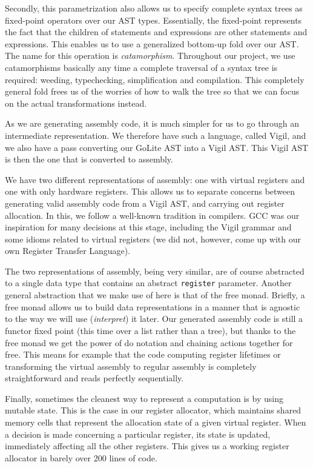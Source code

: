 \documentclass[letterpaper,11pt]{article}
\begin{document}
Secondly, this parametrization also allows us to specify complete syntax trees as fixed-point operators over our AST types. Essentially, the fixed-point represents the fact that the children of statements and expressions are other statements and expressions. This enables us to use a generalized bottom-up fold over our AST. The name for this operation is \emph{catamorphism}. Throughout our project, we use catamorphisms basically any time a complete traversal of a syntax tree is required: weeding, typechecking, simplification and compilation. This completely general fold frees us of the worries of how to walk the tree so that we can focus on the actual transformations instead.

As we are generating assembly code, it is much simpler for us to go through an intermediate representation. We therefore have such a language, called Vigil, and we also have a pass converting our GoLite AST into a Vigil AST. This Vigil AST is then the one that is converted to assembly.

We have two different representations of assembly: one with virtual registers and one with only hardware registers. This allows us to separate concerns between generating valid assembly code from a Vigil AST, and carrying out register allocation. In this, we follow a well-known tradition in compilers. GCC was our inspiration for many decisions at this stage, including the Vigil grammar and some idioms related to virtual registers (we did not, however, come up with our own Register Transfer Language).

The two representations of assembly, being very similar, are of course abstracted to a single data type that contains an abstract \texttt{register} parameter. Another general abstraction that we make use of here is that of the free monad. Briefly, a free monad allows us to build data representations in a manner that is agnostic to the way we will use (\emph{interpret}) it later. Our generated assembly code is still a functor fixed point (this time over a list rather than a tree), but thanks to the free monad we get the power of do notation and chaining actions together for free. This means for example that the code computing register lifetimes or transforming the virtual assembly to regular assembly is completely straightforward and reads perfectly sequentially.

Finally, sometimes the cleanest way to represent a computation is by using mutable state. This is the case in our register allocator, which maintains shared memory cells that represent the allocation state of a given virtual register. When a decision is made concerning a particular register, its state is updated, immediately affecting all the other registers. This gives us a working register allocator in barely over 200 lines of code.
\end{document}
